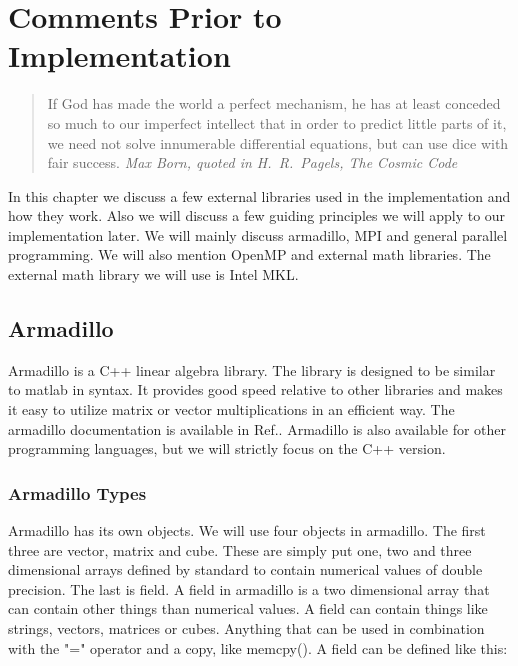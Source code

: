 \chapter{Comments Prior to Implementation}
 
\begin{quotation}
If God has made the world a perfect mechanism, he has at least
conceded so much to our imperfect intellect that in order to predict
little parts of it, we need not solve innumerable differential
equations, but can use dice with fair success.  
{\em Max Born, quoted  in H.~R.~Pagels, The Cosmic Code \cite{pagels1982}}
\end{quotation}



In this chapter we discuss a few external libraries used in the implementation and how they work. Also we will discuss a few guiding principles we will apply to our implementation later. We will mainly discuss armadillo, MPI and general parallel programming. We will also mention OpenMP and external math libraries. The external math library we will use is Intel MKL.

\section{Armadillo}
Armadillo is a C++ linear algebra library. The library is designed to be similar to matlab in syntax. It provides good speed relative to other libraries and makes it easy to utilize matrix or vector multiplications in an efficient way. The armadillo documentation is available in Ref.\cite{armadillo-ref1}. Armadillo is also available for other programming languages, but we will strictly focus on the C++ version.

\subsection{Armadillo Types}
Armadillo has its own objects. We will use four objects in armadillo. The first three are vector, matrix and cube. These are simply put one, two and three dimensional arrays defined by standard to contain numerical values of double precision. The last is field. A field in armadillo is a two dimensional array that can contain other things than numerical values. A field can contain things like strings, vectors, matrices or cubes. Anything that can be used in combination with the "=" operator and a copy, like memcpy(). A field can be defined like this:

